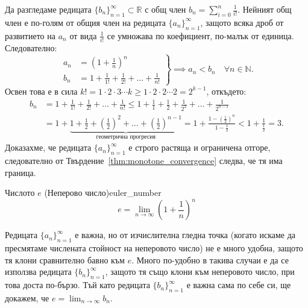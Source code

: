 Да разгледаме редицата $\{b_n\}_{n=1}^{\infty} \subset \mathbb{R}$ с общ член $b_n = \sum_{i=0}^n \frac{1}{i!}$. Нейният общ член е по-голям от общия член на редицата $\{a_n\}_{n=1}^{\infty}$, защото всяка дроб от развитието на $a_n$ от вида $\frac{1}{i!}$ се умножава по коефициент, по-малък от единица. Следователно:
\[
\left.
\begin{aligned}
a_n &= \left(1 + \frac{1}{n}\right)^n \\
b_n &= 1 + \frac{1}{1!} + \frac{1}{2!} + \dots + \frac{1}{n!}
\end{aligned}
\right\} \implies a_n < b_n \quad \forall n \in \mathbb{N}.
\]
Освен това е в сила $k! = 1 \cdot 2 \cdot 3 \cdots k \ge 1 \cdot 2 \cdot 2 \cdots 2 = 2^{k-1}$, откъдето:
\begin{align*}
b_n &= 1 + \frac{1}{1!} + \frac{1}{2!} + \dots + \frac{1}{n!} \le 1 + \frac{1}{1} + \frac{1}{2} + \frac{1}{2^2} + \dots + \frac{1}{2^{n-1}} \\
&= 1 + \underbrace{1 + \frac{1}{2} + \left(\frac{1}{2}\right)^2 + \dots + \left(\frac{1}{2}\right)^{n-1}}_{\text{геометрична прогресия}} = 1 + \frac{1 - \left(\frac{1}{2}\right)^n}{1 - \frac{1}{2}} < 1 + \frac{1}{\frac{1}{2}} = 3.
\end{align*}
Доказахме, че редицата $\{a_n\}_{n=1}^{\infty}$ е строго растяща и ограничена отгоре, следователно от Твърдение~\ref{thm:monotone_convergence} следва, че тя има граница.

\begin{definition}{Числото $e$ (Неперово число)}{euler_number}
\[
e = \lim_{n\to\infty} \left(1 + \frac{1}{n}\right)^n
\]
\end{definition}

Редицата $\{a_n\}_{n=1}^{\infty}$ е важна, но от изчислителна гледна точка (когато искаме да пресмятаме числената стойност на неперовото число) не е много удобна, защото тя клони сравнително бавно към $e$. Много по-удобно в такива случаи е да се използва редицата $\{b_n\}_{n=1}^{\infty}$, защото тя също клони към неперовото число, при това доста по-бързо. Тъй като редицата $\{b_n\}_{n=1}^{\infty}$ е важна сама по себе си, ще докажем, че $e = \lim_{n\to\infty} b_n$.

